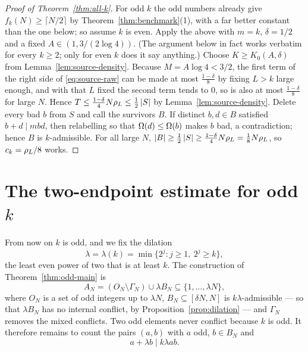 \documentclass[11pt]{article}
\begin{document}
\begin{proof}[Proof of Theorem~\ref{thm:all-k}]
For odd \(k\) the odd numbers already give \(f_k(N)\geq\lceil N/2\rceil\) by
Theorem~\ref{thm:benchmark}(1), with a far better constant than the one below;
so assume \(k\) is even. Apply the above
with \(m=k\), \(\delta=1/2\) and a fixed \(A\in(1,3/(2\log4))\). (The
argument below in fact works verbatim for every \(k\geq2\); only for even
\(k\) does it say anything.) Choose
\(K\geq K_0(A,\delta)\) from Lemma~\ref{lem:source-density}. Because
\(M=A\log4<3/2\), the first term of the right side of \eqref{eq:source-raw}
can be made at most \(\frac{1-\delta}{8}\) by fixing \(L>k\) large enough, and
with that \(L\) fixed the second term tends to \(0\), so is also at most
\(\frac{1-\delta}{8}\) for large \(N\). Hence
\(T\leq\frac{1-\delta}{4}N\rho_L\leq\frac12\left|S\right|\) by
Lemma~\ref{lem:source-density}. Delete every bad \(b\) from \(S\) and call the
survivors \(B\). If distinct
\(b,d\in B\) satisfied \(b+d\mid mbd\), then relabelling so that
\(\Omega(d)\leq\Omega(b)\) makes \(b\) bad, a contradiction; hence \(B\) is
\(k\)-admissible. For all large \(N\),
\(\left|B\right|\geq\frac12\left|S\right|\geq\frac{1-\delta}{4}N\rho_L=\frac18N\rho_L\), so
\(c_k=\rho_L/8\) works.
\end{proof}

\section{The two-endpoint estimate for odd \texorpdfstring{\(k\)}{k}}
\label{sec:mixed}

From now on \(k\) is odd, and we fix the dilation
\begin{equation}\label{eq:lambda}
 \lambda=\lambda(k)=\min\{2^j:j\geq1,\ 2^j\geq k\},
\end{equation}
the least even power of two that is at least \(k\). The construction of
Theorem~\ref{thm:odd-main} is
\[
 A_N=(O_N\setminus\Gamma_N)\cup\lambda B_N\subseteq\{1,\ldots,\lambda N\},
\]
where \(O_N\) is a set of odd integers up to \(\lambda N\),
\(B_N\subseteq[\delta N,N]\) is \(k\lambda\)-admissible --- so that
\(\lambda B_N\) has no internal conflict, by
Proposition~\ref{prop:dilation} --- and \(\Gamma_N\) removes the mixed
conflicts. Two odd elements never conflict because \(k\) is odd. It therefore
remains to count the pairs \((a,b)\) with \(a\) odd, \(b\in B_N\) and
\begin{equation}\label{eq:mixed-conflict}
 a+\lambda b\mid k\lambda ab .
\end{equation}
\end{document}
